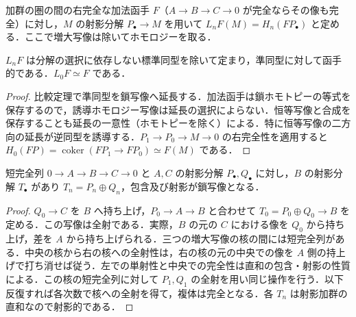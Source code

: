 \begin{defn}[左導来函手]
加群の圏の間の右完全な加法函手 $F$（$A\to B\to C\to0$ が完全ならその像も完全）に対し，$M$ の射影分解 $P_\bullet\to M$ を用いて $L_nF(M)=H_n(FP_\bullet)$ と定める．ここで増大写像は除いてホモロジーを取る．
\end{defn}
\begin{prop}[導来函手の分解独立性]
$L_nF$ は分解の選択に依存しない標準同型を除いて定まり，準同型に対して函手的である．$L_0F\simeq F$ である．
\end{prop}
\begin{proof}
比較定理で準同型を鎖写像へ延長する．加法函手は鎖ホモトピーの等式を保存するので，誘導ホモロジー写像は延長の選択によらない．恒等写像と合成を保存することも延長の一意性（ホモトピーを除く）による．特に恒等写像の二方向の延長が逆同型を誘導する．$P_1\to P_0\to M\to0$ の右完全性を適用すると $H_0(FP)=\operatorname{coker}(FP_1\to FP_0)\simeq F(M)$ である．
\end{proof}
\begin{prop}[馬蹄形補題]
短完全列 $0\to A\to B\to C\to0$ と $A,C$ の射影分解 $P_\bullet,Q_\bullet$ に対し，$B$ の射影分解 $T_\bullet$ があり $T_n=P_n\oplus Q_n$，包含及び射影が鎖写像となる．
\end{prop}
\begin{proof}
$Q_0\to C$ を $B$ へ持ち上げ，$P_0\to A\to B$ と合わせて $T_0=P_0\oplus Q_0\to B$ を定める．この写像は全射である．実際，$B$ の元の $C$ における像を $Q_0$ から持ち上げ，差を $A$ から持ち上げられる．三つの増大写像の核の間には短完全列がある．中央の核から右の核への全射性は，右の核の元の中央での像を $A$ 側の持上げで打ち消せば従う．左での単射性と中央での完全性は直和の包含・射影の性質による．この核の短完全列に対して $P_1,Q_1$ の全射を用い同じ操作を行う．以下反復すれば各次数で核への全射を得て，複体は完全となる．各 $T_n$ は射影加群の直和なので射影的である．
\end{proof}
